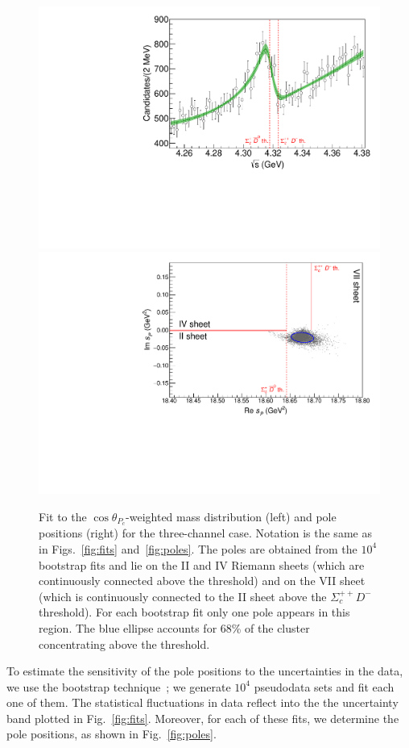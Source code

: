 \documentclass[aps,prl,
twocolumn,nofootinbib,
superscriptaddress,preprintnumbers]{revtex4-1}
\begin{document}
\begin{figure}
\centering
\includegraphics[width=.49\textwidth]{plot_3nc.pdf}
\includegraphics[width=.49\textwidth]{general_3nc.pdf}
\caption{
Fit to the $\cos\theta_{P_c}$-weighted \jpsip mass distribution (left) and pole positions (right) for the three-channel case.
Notation is the same as in Figs.~\ref{fig:fits} and~\ref{fig:poles}.
The poles are obtained from the $10^4$ bootstrap fits
and lie on the II and IV Riemann sheets
(which are continuously connected above the \SigmaD threshold)
and on the VII sheet (which is continuously connected to the II sheet
above the $\Sigma_c^{++} D^-$ threshold).
For each bootstrap fit only one pole appears in this region. The blue ellipse accounts for 68\% of the cluster concentrating above
the \SigmaD threshold.
} 
\label{fig:3chan}
\end{figure} 
To estimate the sensitivity of the pole positions 
to the uncertainties in the data, we use the bootstrap technique~\cite{recipes,EfroTibs93}; 
\ie we generate $10^4$ pseudodata sets and fit each one of them. 
The statistical fluctuations in data reflect into the the uncertainty band plotted in Fig.~\ref{fig:fits}. Moreover, for each of these fits, we determine the pole positions, as shown in Fig.~\ref{fig:poles}. 
\end{document}
